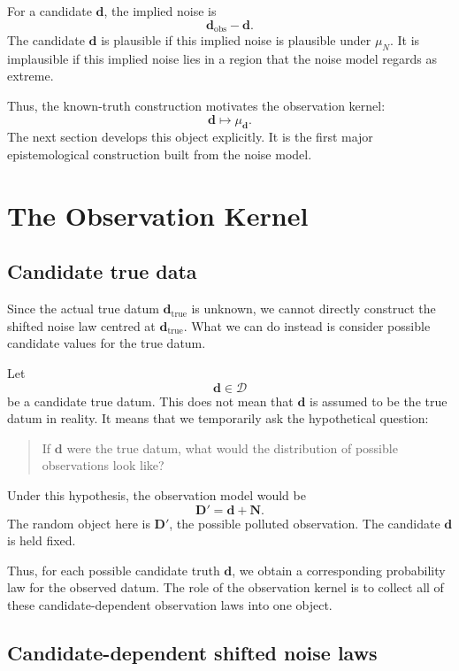 \documentclass[11pt]{article}
\newcommand{\Dspace}{\mathcal D}
\newcommand{\muN}{\mu_N}
\newcommand{\Dobsrand}{\mathbf D'}
\newcommand{\Nrand}{\mathbf N}
\newcommand{\dtrue}{\mathbf d_{\mathrm{true}}}
\newcommand{\dobs}{\mathbf d_{\mathrm{obs}}}
\begin{document}
For a candidate \(\mathbf d\), the implied noise is
\[
    \dobs-\mathbf d.
\]
The candidate \(\mathbf d\) is plausible if this implied noise is plausible under \(\muN\). It is implausible if this implied noise lies in a region that the noise model regards as extreme.

Thus, the known-truth construction motivates the observation kernel:
\[
    \mathbf d
    \longmapsto
    \mu_{\mathbf d}.
\]
The next section develops this object explicitly. It is the first major epistemological construction built from the noise model.

\section{The Observation Kernel}

\subsection{Candidate true data}

Since the actual true datum \(\dtrue\) is unknown, we cannot directly construct the shifted noise law centred at \(\dtrue\). What we can do instead is consider possible candidate values for the true datum.

Let
\[
    \mathbf d\in\Dspace
\]
be a candidate true datum. This does not mean that \(\mathbf d\) is assumed to be the true datum in reality. It means that we temporarily ask the hypothetical question:

\begin{quote}
    If \(\mathbf d\) were the true datum, what would the distribution of possible observations look like?
\end{quote}

Under this hypothesis, the observation model would be
\[
    \Dobsrand = \mathbf d + \Nrand.
\]
The random object here is \(\Dobsrand\), the possible polluted observation. The candidate \(\mathbf d\) is held fixed.

Thus, for each possible candidate truth \(\mathbf d\), we obtain a corresponding probability law for the observed datum. The role of the observation kernel is to collect all of these candidate-dependent observation laws into one object.

\subsection{Candidate-dependent shifted noise laws}
\end{document}
